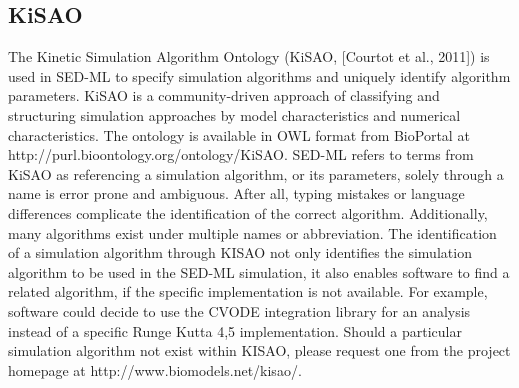 \subsection{KiSAO}
\label{sec:kisao}

The Kinetic Simulation Algorithm Ontology (KiSAO, [Courtot et al., 2011]) is used in SED-ML to specify simulation algorithms and uniquely identify algorithm parameters. 
KiSAO is a community-driven approach of classifying and structuring simulation approaches by model characteristics and numerical characteristics. 
The ontology is available in OWL format from BioPortal at http://purl.bioontology.org/ontology/KiSAO. 
SED-ML refers to terms from KiSAO as referencing a simulation algorithm, or its parameters, solely through a name is error prone and ambiguous. 
After all, typing mistakes or language differences complicate the identification of the correct algorithm. 
Additionally, many algorithms exist under multiple names or abbreviation. 
The identification of a simulation algorithm through KISAO not only identifies the simulation algorithm to be used in the SED-ML simulation, it also enables software to find a related algorithm, if the specific implementation is not available. 
For example, software could decide to use the CVODE integration library for an analysis instead of a specific Runge Kutta 4,5 implementation. 
Should a particular simulation algorithm not exist within KISAO, please request one from the project homepage at http://www.biomodels.net/kisao/.





